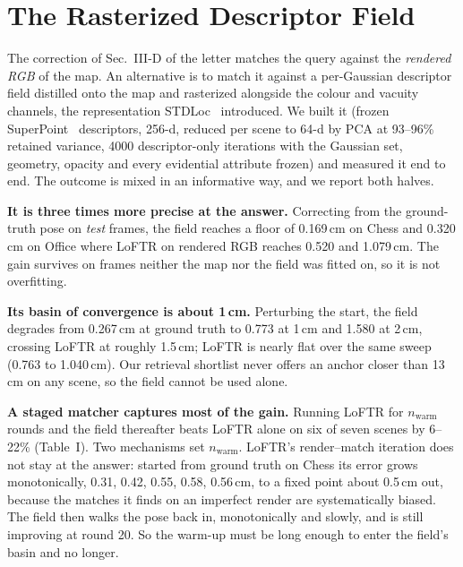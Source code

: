 \documentclass[journal]{IEEEtran}
\begin{document}
\section{The Rasterized Descriptor Field}
\label{sec:locfeat}
The correction of Sec.~III-D of the letter matches the query against the
\emph{rendered RGB} of the map. An alternative is to match it against a
per-Gaussian descriptor field distilled onto the map and rasterized alongside
the colour and vacuity channels, the representation STDLoc~\cite{stdloc}
introduced. We built it (frozen SuperPoint~\cite{superpoint} descriptors,
256-d, reduced per scene to 64-d by PCA at 93--96\% retained variance,
4000 descriptor-only iterations with the Gaussian set, geometry, opacity and
every evidential attribute frozen) and measured it end to end. The outcome is
mixed in an informative way, and we report both halves.

\textbf{It is three times more precise at the answer.} Correcting from the
ground-truth pose on \emph{test} frames, the field reaches a floor of
0.169\,cm on Chess and 0.320\,cm on Office where LoFTR on rendered RGB reaches
0.520 and 1.079\,cm. The gain survives on frames neither the map nor the field
was fitted on, so it is not overfitting.

\textbf{Its basin of convergence is about 1\,cm.} Perturbing the start,
the field degrades from 0.267\,cm at ground truth to 0.773 at 1\,cm and 1.580
at 2\,cm, crossing LoFTR at roughly 1.5\,cm; LoFTR is nearly flat over the
same sweep (0.763 to 1.040\,cm). Our retrieval shortlist never offers an
anchor closer than 13\,cm on any scene, so the field cannot be used alone.

\textbf{A staged matcher captures most of the gain.} Running LoFTR for
$n_\mathrm{warm}$ rounds and the field thereafter beats LoFTR alone on six of
seven scenes by 6--22\% (Table~I). Two mechanisms set $n_\mathrm{warm}$.
LoFTR's render--match iteration does not stay at the answer: started from
ground truth on Chess its error grows monotonically, 0.31, 0.42, 0.55, 0.58,
0.56\,cm, to a fixed point about 0.5\,cm out, because the matches it finds on
an imperfect render are systematically biased. The field then walks the pose
back in, monotonically and slowly, and is still improving at round 20. So the
warm-up must be long enough to enter the field's basin and no longer.
\end{document}
